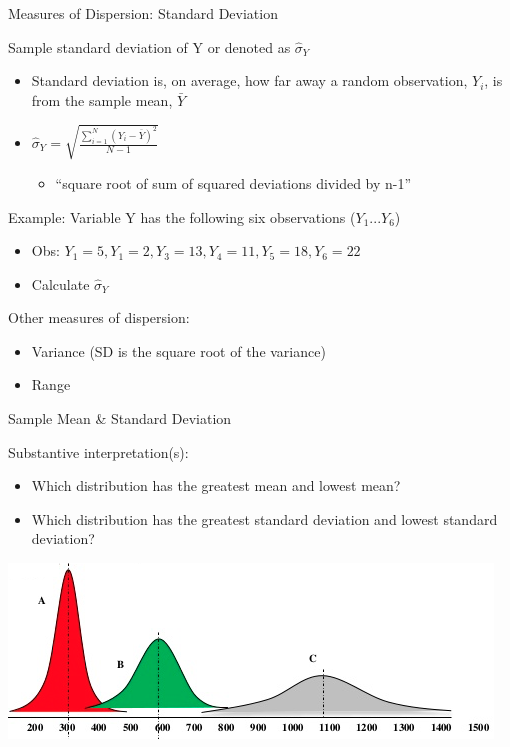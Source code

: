 \documentclass[
  8pt,
  ignorenonframetext,
  dvipsnames]{beamer}
\providecommand{\tightlist}{%
  \setlength{\itemsep}{0pt}\setlength{\parskip}{0pt}}
\let\olditem\item
\renewcommand{\item}{%
  \olditem\vspace{4pt}
}
\begin{document}
\begin{frame}{Measures of Dispersion: Standard Deviation}
\protect\hypertarget{measures-of-dispersion-standard-deviation}{}

Sample standard deviation of Y or denoted as \(\hat\sigma_Y\)

\begin{itemize}
\item
  Standard deviation is, on average, how far away a random observation,
  \(Y_i\), is from the sample mean, \(\bar{Y}\)
\item
  \(\hat\sigma_Y = \sqrt{\frac{\sum_{i=1}^N (Y_i - \overline{Y})^2}{N-1}}\)

  \begin{itemize}
  \tightlist
  \item
    ``square root of sum of squared deviations divided by n-1''
  \end{itemize}
\end{itemize}

\medskip

Example: Variable Y has the following six observations (\(Y_1... Y_6\))

\begin{itemize}
\tightlist
\item
  Obs: \(Y_1 = 5, Y_1 = 2, Y_3 = 13, Y_4 = 11, Y_5 = 18, Y_6 = 22\)
\item
  Calculate \(\hat\sigma_Y\)
\end{itemize}

\medskip

Other measures of dispersion:

\begin{itemize}
\tightlist
\item
  Variance (SD is the square root of the variance)
\item
  Range
\end{itemize}

\end{frame}

\begin{frame}{Sample Mean \& Standard Deviation}
\protect\hypertarget{sample-mean-standard-deviation}{}

Substantive interpretation(s):

\begin{itemize}
\tightlist
\item
  Which distribution has the greatest mean and lowest mean?
\item
  Which distribution has the greatest standard deviation and lowest
  standard deviation?
\end{itemize}

\includegraphics{distributions.png}

\end{frame}
\end{document}
